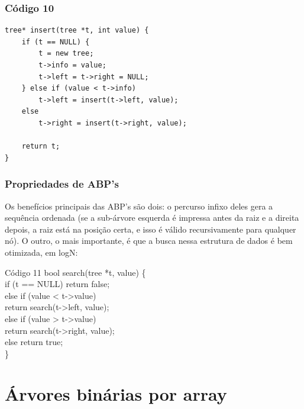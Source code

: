 \documentclass{beamer}
\begin{document}
	\begin{frame}[fragile]
	\frametitle{Código 10}
		\begin{lstlisting}
tree* insert(tree *t, int value) {
    if (t == NULL) {
        t = new tree;
        t->info = value;
        t->left = t->right = NULL;
    } else if (value < t->info)
        t->left = insert(t->left, value);
    else
        t->right = insert(t->right, value);

    return t;
}
		\end{lstlisting}
	\end{frame}
	
	\begin{frame}
	\frametitle{Propriedades de ABP's}
		Os benefícios principais das ABP's são dois: o percurso
		infixo deles gera a sequência ordenada (se a sub-árvore esquerda
		é impressa antes da raiz e a direita depois, a raiz está na
		posição certa, e isso é válido recursivamente para qualquer nó).
		O outro, o mais importante, é que a busca nessa estrutura de
		dados é bem otimizada, em logN:
		\begin{block}{Código 11}
		\hspace{10 pt} bool search(tree *t, value) \{\\
		\hspace{20 pt} if (t == NULL) return false;\\
		\hspace{20 pt} else if (value < t->value)\\
		\hspace{30 pt} return search(t->left, value);\\
		\hspace{20 pt} else if (value > t->value)\\
		\hspace{30 pt} return search(t->right, value);\\
		\hspace{20 pt} else return true;\\
		\hspace{10 pt} \}
		\end{block}
	\end{frame}

	\section{Árvores binárias por array}
\end{document}
